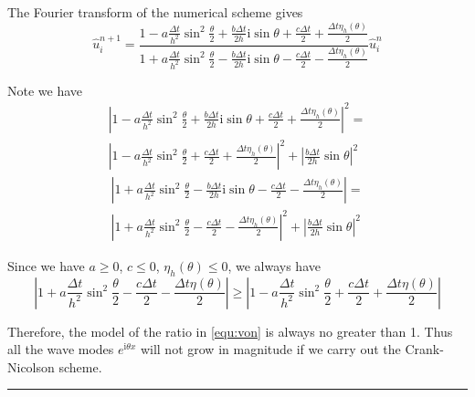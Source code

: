 \documentclass[10pt,a4paper]{article}
\newcommand{\ii}[0]{\mathrm{i}}
\theoremstyle{definition}
\begin{document}
The Fourier transform of the numerical scheme gives
\begin{equation}\label{equ:von}
	\hat u_i^{n+1} = \frac{{1 - a\frac{{\Delta t}}{{{h^2}}}{{\sin }^2}\frac{\theta }{2} + \frac{{b\Delta t}}{{2h}}\ii\sin \theta  + \frac{{c\Delta t}}{2}+ \frac{{\Delta t\eta_h (\theta )}}{2}}}{{1 + a\frac{{\Delta t}}{{{h^2}}}{{\sin }^2}\frac{\theta }{2} - \frac{{b\Delta t}}{{2h}}\ii\sin \theta  - \frac{{c\Delta t}}{2} - \frac{{\Delta t\eta_h (\theta )}}{2}}} \hat u_i^n
\end{equation}

Note we have
\begin{multline}
{\left| {1 - a\frac{{\Delta t}}{{{h^2}}}{{\sin }^2}\frac{\theta }{2} + \frac{{b\Delta t}}{{2h}}\ii\sin \theta  + \frac{{c\Delta t}}{2} + \frac{{\Delta t\eta_h (\theta )}}{2}} \right|^2} = \\
{\left| {1 - a\frac{{\Delta t}}{{{h^2}}}{{\sin }^2}\frac{\theta }{2} + \frac{{c\Delta t}}{2} + \frac{{\Delta t\eta_h (\theta )}}{2}} \right|^2} + {\left| {\frac{{b\Delta t}}{{2h}}\sin \theta } \right|^2}
\end{multline}
\begin{multline}
\left| {1 + a\frac{{\Delta t}}{{{h^2}}}{{\sin }^2}\frac{\theta }{2} - \frac{{b\Delta t}}{{2h}}\ii\sin \theta  - \frac{{c\Delta t}}{2} - \frac{{\Delta t\eta_h (\theta )}}{2}} \right| = \\
{\left| {1 + a\frac{{\Delta t}}{{{h^2}}}{{\sin }^2}\frac{\theta }{2} - \frac{{c\Delta t}}{2} - \frac{{\Delta t\eta_h (\theta )}}{2}} \right|^2} + {\left| {\frac{{b\Delta t}}{{2h}}\sin \theta } \right|^2}
\end{multline}

Since we have $a\geq 0$, $c\leq 0$, $\eta_h(\theta)\leq  0$, we always have
\begin{equation}
	\left| {1 + a\frac{{\Delta t}}{{{h^2}}}{{\sin }^2}\frac{\theta }{2} - \frac{{c\Delta t}}{2} - \frac{{\Delta t\eta (\theta )}}{2}} \right| \ge \left| {1 - a\frac{{\Delta t}}{{{h^2}}}{{\sin }^2}\frac{\theta }{2} + \frac{{c\Delta t}}{2} + \frac{{\Delta t\eta (\theta )}}{2}} \right|
\end{equation}

Therefore, the model of the ratio in \cref{equ:von} is always no greater than 1. Thus all the wave modes $e^{\ii \theta x}$ will not grow in magnitude if we carry out the Crank-Nicolson scheme. 

\hrule
\end{document}
